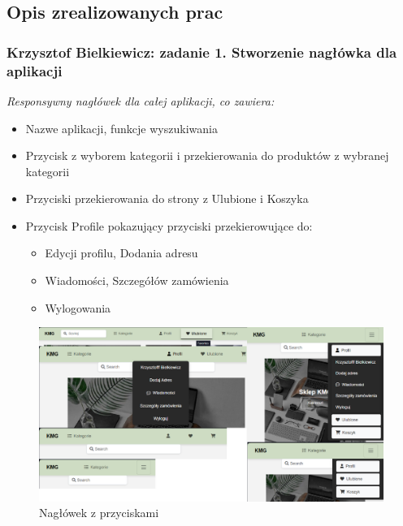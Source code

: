 \documentclass[12pt,a4paper,oneside]{article}
\theoremstyle{definition}
\numberwithin{equation}{section}
\begin{document}
\subsection {Opis zrealizowanych prac}
\subsubsection{Krzysztof Bielkiewicz: zadanie 1. Stworzenie nagłówka dla aplikacji}
\label{1.3.1}
\textit{Responsywny nagłówek dla całej aplikacji, co zawiera:}
\begin{itemize}
    \item Nazwe aplikacji, funkcje wyszukiwania
    \item Przycisk z wyborem kategorii i przekierowania do produktów z wybranej kategorii
    \item Przyciski przekierowania do strony z Ulubione i Koszyka
    \item Przycisk Profile pokazujący przyciski przekierowujące do:
        \begin{itemize}
            \item Edycji profilu, Dodania adresu
            \item Wiadomości, Szczegółów zamówienia
            \item Wylogowania
        \end{itemize}
\end{itemize}

\begin{figure}[H]
    \centering
    \includegraphics[width=0.9\columnwidth]{images/krzysztofBImages/header.png}
    \caption{Nagłówek z przyciskami}
    \label{header}
\end{figure}
\end{document}
